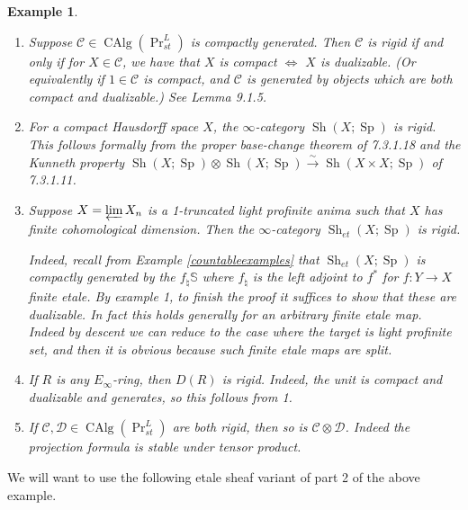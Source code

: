 \documentclass[12pt]{article}
\newtheorem{example}[theorem]{Example}
\newcommand{\on}{\operatorname}
\newcommand{\mbb}{\mathbb}
\begin{document}
\begin{example}\label{rigidexamples}
\begin{enumerate}
\item Suppose $\mathcal{C}\in\on{CAlg}(\on{Pr}^L_{st})$ is compactly generated.  Then $\mathcal{C}$ is rigid if and only if for $X\in\mathcal{C}$, we have that $X$ is compact $\Leftrightarrow$ $X$ is dualizable.  (Or equivalently if $1\in\mathcal{C}$ is compact, and $\mathcal{C}$ is generated by objects which are both compact and dualizable.)  See \cite{GaitsgoryDerivedI} Lemma 9.1.5.
\item For a compact Hausdorff space $X$, the $\infty$-category $\on{Sh}(X;\on{Sp})$ is rigid.  This follows formally from the proper base-change theorem of \cite{LurieHTT} 7.3.1.18 and the Kunneth property $\on{Sh}(X;\on{Sp})\otimes\on{Sh}(X;\on{Sp})\overset{\sim}{\rightarrow}\on{Sh}(X\times X;\on{Sp})$ of \cite{LurieHTT} 7.3.1.11.
\item Suppose $X=\varprojlim X_n$ is a 1-truncated light profinite anima such that $X$ has finite cohomological dimension.  Then the $\infty$-category $\on{Sh}_{et}(X;\on{Sp})$ is rigid.

Indeed, recall from Example \ref{countableexamples} that $\on{Sh}_{et}(X;\on{Sp})$ is compactly generated by the $f_\natural\mbb{S}$ where $f_\natural$ is the left adjoint to $f^\ast$ for $f:Y\to X$ finite etale.  By example 1, to finish the proof it suffices to show that these are dualizable.  In fact this holds generally for an arbitrary finite etale map.  Indeed by descent we can reduce to the case where the target is light profinite set, and then it is obvious because such finite etale maps are split.

\item If $R$ is any $E_\infty$-ring, then $D(R)$ is rigid.  Indeed, the unit is compact and dualizable and generates, so this follows from 1.

\item If $\mathcal{C},\mathcal{D}\in\on{CAlg}(\on{Pr}^L_{st})$ are both rigid, then so is $\mathcal{C}\otimes\mathcal{D}$.  Indeed the projection formula is stable under tensor product.
\end{enumerate}
\end{example}

We will want to use the following etale sheaf variant of  part 2 of the above example.
\end{document}
